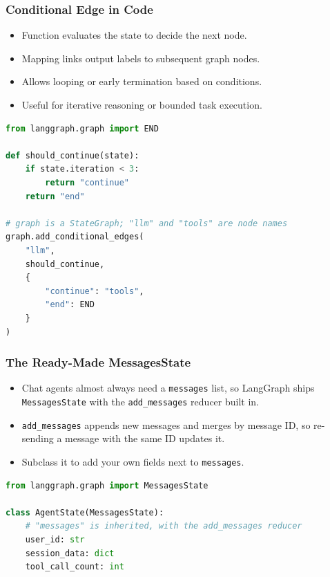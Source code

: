 \begin{frame}[fragile]\frametitle{Conditional Edge in Code}
\begin{itemize}
  \item Function evaluates the state to decide the next node.
  \item Mapping links output labels to subsequent graph nodes.
  \item Allows looping or early termination based on conditions.
  \item Useful for iterative reasoning or bounded task execution.
\end{itemize}

\begin{lstlisting}[language=Python, basicstyle=\scriptsize\ttfamily]
from langgraph.graph import END

def should_continue(state):
    if state.iteration < 3:
        return "continue"
    return "end"

# graph is a StateGraph; "llm" and "tools" are node names
graph.add_conditional_edges(
    "llm",
    should_continue,
    {
        "continue": "tools",
        "end": END
    }
)
\end{lstlisting}


\end{frame}
\begin{frame}[fragile]\frametitle{The Ready-Made MessagesState}
      \begin{itemize}
        \item Chat agents almost always need a \texttt{messages} list, so LangGraph ships \texttt{MessagesState} with the \texttt{add\_messages} reducer built in.
        \item \texttt{add\_messages} appends new messages and merges by message ID, so re-sending a message with the same ID updates it.
        \item Subclass it to add your own fields next to \texttt{messages}.
      \end{itemize}
\begin{lstlisting}[language=Python]
from langgraph.graph import MessagesState

class AgentState(MessagesState):
    # "messages" is inherited, with the add_messages reducer
    user_id: str
    session_data: dict
    tool_call_count: int
\end{lstlisting}
\end{frame}
